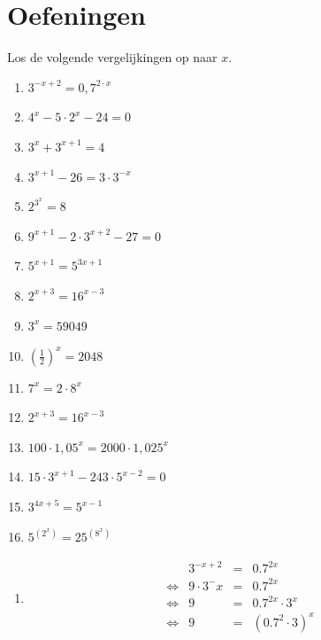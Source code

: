 %
%

\section{Oefeningen}
\begin{oef}     
Los de volgende vergelijkingen op naar $x$. 
\begin{multicols}{2}
\begin{enumerate}
  \item $3^{-x+2}=0,7^{2\cdot x}$
  \item $4^{x}-5\cdot 2^{x}-24=0$
  \item $3^{x}+3^{x+1}=4$
  \item $3^{x+1}-26=3\cdot 3^{-x}$
  \item $2^{3^x}=8$
  \item $9^{x+1}-2\cdot 3^{x+2}-27=0$
  \item $5^{x+1}=5^{3x+1}$
  \item $2^{x+3}=16^{x-3}$
  \item $3^x=59049$
  \item $\left(\frac12\right)^x=2048$
  \item $7^x=2\cdot 8^x$
  \item $2^{x+3}=16^{x-3}$
  \item $100 \cdot 1,05^x=2000\cdot 1,025^x$
  \item $15\cdot 3^{x+1}-243\cdot 5^{x-2}=0$
  \item $3^{4x+5}=5^{x-1}$
  \item $5^{(2^x)} = 25^{(8^x)}$
\end{enumerate}
\end{multicols}
\begin{opl}
\begin{enumerate}
  \item \[
          \begin{array}{rrclcl}
                 & 3^{-x+2} & = & 0.7^{2x} \\
            \iff & 9 \cdot 3^-x & = & 0.7^{2x} \\
            \iff & 9 & = & 0.7^{2x} \cdot 3^x \\
            \iff & 9 & = & (0.7^2 \cdot 3)^x \\

\end{array}\]
\end{enumerate}
\end{opl}
\end{oef}

